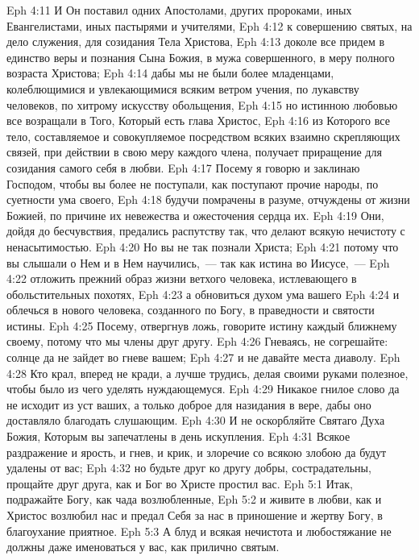 \vs Eph 4:11 И Он поставил одних Апостолами, других пророками, иных Евангелистами, иных пастырями и учителями,
\vs Eph 4:12 к совершению святых, на дело служения, для созидания Тела Христова,
\vs Eph 4:13 доколе все придем в единство веры и познания Сына Божия, в мужа совершенного, в меру полного возраста Христова;
\vs Eph 4:14 дабы мы не были более младенцами, колеблющимися и увлекающимися всяким ветром учения, по лукавству человеков, по хитрому искусству обольщения,
\vs Eph 4:15 но истинною любовью все возращали в Того, Который есть глава Христос,
\vs Eph 4:16 из Которого все тело, составляемое и совокупляемое посредством всяких взаимно скрепляющих связей, при действии в свою меру каждого члена, получает приращение для созидания самого себя в любви.
\rsbpar\vs Eph 4:17 Посему я говорю и заклинаю Господом, чтобы вы более не поступали, как поступают прочие народы, по суетности ума своего,
\vs Eph 4:18 будучи помрачены в разуме, отчуждены от жизни Божией, по причине их невежества и ожесточения сердца их.
\vs Eph 4:19 Они, дойдя до бесчувствия, предались распутству так, что делают всякую нечистоту с ненасытимостью.
\vs Eph 4:20 Но вы не так познали Христа;
\vs Eph 4:21 потому что вы слышали о Нем и в Нем научились,~--- так как истина во Иисусе,~---
\vs Eph 4:22 отложить прежний образ жизни ветхого человека, истлевающего в обольстительных похотях,
\vs Eph 4:23 а обновиться духом ума вашего
\vs Eph 4:24 и облечься в нового человека, созданного по Богу, в праведности и святости истины.
\rsbpar\vs Eph 4:25 Посему, отвергнув ложь, говорите истину каждый ближнему своему, потому что мы члены друг другу.
\vs Eph 4:26 Гневаясь, не согрешайте: солнце да не зайдет во гневе вашем;
\vs Eph 4:27 и не давайте места диаволу.
\vs Eph 4:28 Кто крал, вперед не кради, а лучше трудись, делая своими руками полезное, чтобы было из чего уделять нуждающемуся.
\vs Eph 4:29 Никакое гнилое слово да не исходит из уст ваших, а только доброе для назидания в вере, дабы оно доставляло благодать слушающим.
\vs Eph 4:30 И не оскорбляйте Святаго Духа Божия, Которым вы запечатлены в день искупления.
\vs Eph 4:31 Всякое раздражение и ярость, и гнев, и крик, и злоречие со всякою злобою да будут удалены от вас;
\vs Eph 4:32 но будьте друг ко другу добры, сострадательны, прощайте друг друга, как и Бог во Христе простил вас.
\vs Eph 5:1 Итак, подражайте Богу, как чада возлюбленные,
\vs Eph 5:2 и живите в любви, как и Христос возлюбил нас и предал Себя за нас в приношение и жертву Богу, в благоухание приятное.
\vs Eph 5:3 А блуд и всякая нечистота и любостяжание не должны даже именоваться у вас, как прилично святым.
